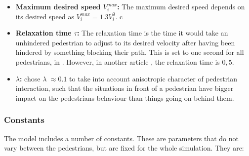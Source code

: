 \begin{itemize}
    \item \textbf{Maximum desired speed $ V_{i}^{max} $:} The maximum 
        desired speed depends on its desired speed as $ V_{i}^{max} =1.3 V_{i}^{0}  $.
       c
        
    \item \textbf{Relaxation time $ \tau $:} The relaxation time is the time it would 
        take an unhindered pedestrian to adjust to its desired velocity after 
        having been hindered by something blocking their path. This is set to 
        one second for all pedestrians, in \cite{self-org}. However, in another article 
        \cite{helbing00}, the relaxation time is $ 0,5 $.

    \item \textbf{$\lambda$:} \cite{ABconstant} chose $\lambda$ $\approx 0.1$ 
        to take into account
    anisotropic character of pedestrian interaction, such that the situations 
    in front of
    a pedestrian have bigger impact on the pedestrians behaviour than things 
    going on
    behind them. 
\end{itemize}

\subsubsection{Constants} \label{constants}
The model includes a number of constants. These are parameters that do not 
vary between the pedestrians, but are fixed for the whole simulation. They are:

